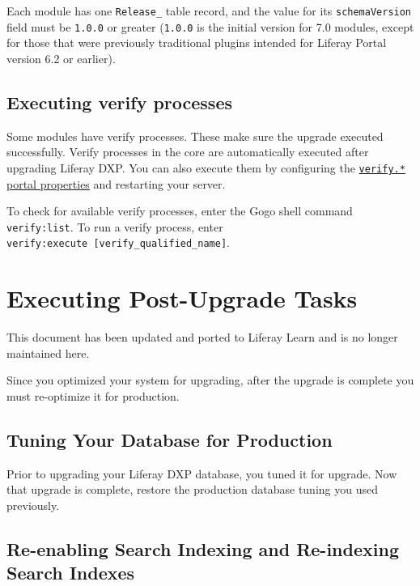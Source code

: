 Each module has one \texttt{Release\_} table record, and the value for
its \texttt{schemaVersion} field must be \texttt{1.0.0} or greater
(\texttt{1.0.0} is the initial version for 7.0 modules, except for those
that were previously traditional plugins intended for Liferay Portal
version 6.2 or earlier).

\section{Executing verify processes}\label{executing-verify-processes}

Some modules have verify processes. These make sure the upgrade executed
successfully. Verify processes in the core are automatically executed
after upgrading Liferay DXP. You can also execute them by configuring
the
\href{@platform-ref@/7.2-latest/propertiesdoc/portal.properties.html\#Verify}{\texttt{verify.*}
portal properties} and restarting your server.

To check for available verify processes, enter the Gogo shell command
\texttt{verify:list}. To run a verify process, enter
\texttt{verify:execute\ {[}verify\_qualified\_name{]}}.

\chapter{Executing Post-Upgrade
Tasks}\label{executing-post-upgrade-tasks}

{This document has been updated and ported to Liferay Learn and is no
longer maintained here.}

Since you optimized your system for upgrading, after the upgrade is
complete you must re-optimize it for production.

\section{Tuning Your Database for
Production}\label{tuning-your-database-for-production}

Prior to upgrading your Liferay DXP database, you tuned it for upgrade.
Now that upgrade is complete, restore the production database tuning you
used previously.

\section{Re-enabling Search Indexing and Re-indexing Search
Indexes}\label{re-enabling-search-indexing-and-re-indexing-search-indexes}

